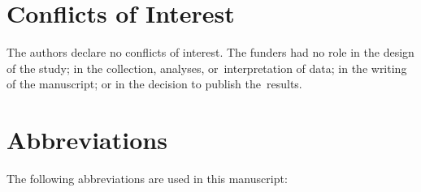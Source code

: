 \documentclass[12pt,a4paper,oneside]{report}
\newcommand{\conflictsofinterest}[1]{\section*{Conflicts of Interest}#1}
\newcommand{\acknowledgments}[1]{\section*{Acknowledgments}#1}
\begin{document}
%
%


\conflictsofinterest{The authors declare 
no conflicts of interest. The funders had no role in the 
design of the study; in the collection, analyses, or~interpretation of data; in 
the writing of the manuscript; or in the decision to publish the~results.} 




\section*{Abbreviations}
The following abbreviations are used in this manuscript:
\end{document}
